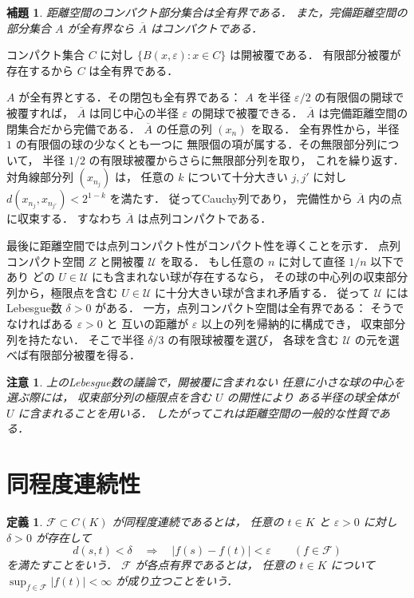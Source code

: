 \documentclass[a5paper,10pt,onecolumn]{jsarticle}
\makeatletter
\theoremstyle{mathnotetheorem}
\newtheorem{definition}[theorem]{定義}
\newtheorem{lemma}[theorem]{補題}
\newtheorem{remark}[theorem]{注意}
\renewcommand{\proofname}{証明}
\renewenvironment{proof}[1][\proofname]{%
  \par\pushQED{\qed}\normalfont\topsep4\p@\@plus2\p@\relax
  \trivlist\item[\hskip\labelsep\bfseries #1]\ignorespaces
}{\popQED\endtrivlist\@endpefalse}
\makeatother
\begin{document}
\begin{lemma}\label{lem:compact-total}
距離空間のコンパクト部分集合は全有界である．
また，完備距離空間の部分集合 $A$ が全有界なら
$\overline A$ はコンパクトである．
\end{lemma}
\begin{proof}
コンパクト集合 $C$ に対し
$\{B(x,\varepsilon):x\in C\}$ は開被覆である．
有限部分被覆が存在するから $C$ は全有界である．

$A$ が全有界とする．その閉包も全有界である：
$A$ を半径 $\varepsilon/2$ の有限個の開球で被覆すれば，
$\overline A$ は同じ中心の半径 $\varepsilon$ の開球で被覆できる．
$\overline A$ は完備距離空間の閉集合だから完備である．
$\overline A$ の任意の列 $(x_n)$ を取る．
全有界性から，半径 $1$ の有限個の球の少なくとも一つに
無限個の項が属する．その無限部分列について，
半径 $1/2$ の有限球被覆からさらに無限部分列を取り，
これを繰り返す．対角線部分列 $(x_{n_j})$ は，
任意の $k$ について十分大きい $j,j'$ に対し
$d(x_{n_j},x_{n_{j'}})<2^{1-k}$ を満たす．
従ってCauchy列であり，
完備性から $\overline A$ 内の点に収束する．
すなわち $\overline A$ は点列コンパクトである．

最後に距離空間では点列コンパクト性がコンパクト性を導くことを示す．
点列コンパクト空間 $Z$ と開被覆 $\mathcal U$ を取る．
もし任意の $n$ に対して直径 $1/n$ 以下であり
どの $U\in\mathcal U$ にも含まれない球が存在するなら，
その球の中心列の収束部分列から，極限点を含む
$U\in\mathcal U$ に十分大きい球が含まれ矛盾する．
従って $\mathcal U$ にはLebesgue数 $\delta>0$ がある．
一方，点列コンパクト空間は全有界である：
そうでなければある $\varepsilon>0$ と
互いの距離が $\varepsilon$ 以上の列を帰納的に構成でき，
収束部分列を持たない．
そこで半径 $\delta/3$ の有限球被覆を選び，
各球を含む $\mathcal U$ の元を選べば有限部分被覆を得る．
\end{proof}

\begin{remark}
上のLebesgue数の議論で，開被覆に含まれない
任意に小さな球の中心を選ぶ際には，
収束部分列の極限点を含む $U$ の開性により
ある半径の球全体が $U$ に含まれることを用いる．
したがってこれは距離空間の一般的な性質である．
\end{remark}

\section{同程度連続性}

\begin{definition}
$\mathcal F\subset C(K)$ が\emph{同程度連続}であるとは，
任意の $t\in K$ と $\varepsilon>0$ に対し
$\delta>0$ が存在して
\[
 d(s,t)<\delta
 \quad\Longrightarrow\quad
 |f(s)-f(t)|<\varepsilon
 \qquad(f\in\mathcal F)
\]
を満たすことをいう．
$\mathcal F$ が\emph{各点有界}であるとは，
任意の $t\in K$ について
$\sup_{f\in\mathcal F}|f(t)|<\infty$
が成り立つことをいう．
\end{definition}
\end{document}

